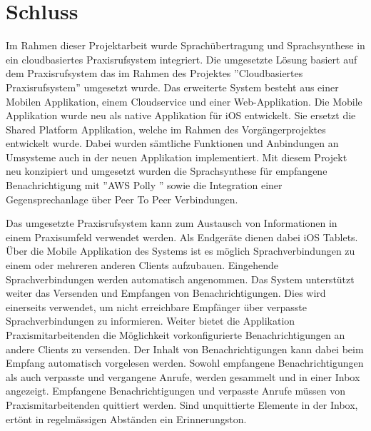 \section{Schluss}

Im Rahmen dieser Projektarbeit wurde Sprachübertragung und Sprachsynthese in ein cloudbasiertes Praxisrufsystem integriert.
Die umgesetzte Lösung basiert auf dem Praxisrufsystem das im Rahmen des Projektes ''Cloudbasiertes Praxisrufsystem'' umgesetzt wurde.\cite{ip5}
Das erweiterte System besteht aus einer Mobilen Applikation, einem Cloudservice und einer Web-Applikation.
Die Mobile Applikation wurde neu als native Applikation für iOS entwickelt.
Sie ersetzt die Shared Platform Applikation, welche im Rahmen des Vorgängerprojektes entwickelt wurde.
Dabei wurden sämtliche Funktionen und Anbindungen an Umsysteme auch in der neuen Applikation implementiert.
Mit diesem Projekt neu konzipiert und umgesetzt wurden die Sprachsynthese für empfangene Benachrichtigung mit ''AWS Polly '' sowie die Integration einer Gegensprechanlage über Peer To Peer Verbindungen.

Das umgesetzte Praxisrufsystem kann zum Austausch von Informationen in einem Praxisumfeld verwendet werden.
Als Endgeräte dienen dabei iOS Tablets.
Über die Mobile Applikation des Systems ist es möglich Sprachverbindungen zu einem oder mehreren anderen Clients aufzubauen.
Eingehende Sprachverbindungen werden automatisch angenommen.
Das System unterstützt weiter das Versenden und Empfangen von Benachrichtigungen.
Dies wird einerseits verwendet, um nicht erreichbare Empfänger über verpasste Sprachverbindungen zu informieren.
Weiter bietet die Applikation Praxismitarbeitenden die Möglichkeit vorkonfigurierte Benachrichtigungen an andere Clients zu versenden.
Der Inhalt von Benachrichtigungen kann dabei beim Empfang automatisch vorgelesen werden.
Sowohl empfangene Benachrichtigungen als auch verpasste und vergangene Anrufe, werden gesammelt und in einer Inbox angezeigt.
Empfangene Benachrichtigungen und verpasste Anrufe müssen von Praxismitarbeitenden quittiert werden.
Sind unquittierte Elemente in der Inbox, ertönt in regelmässigen Abständen ein Erinnerungston.

